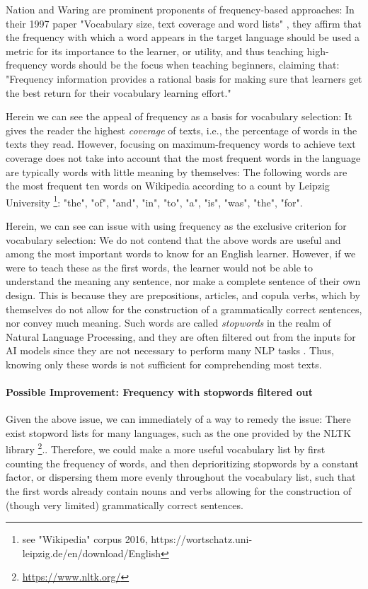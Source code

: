 Nation and Waring are prominent proponents of frequency-based approaches:
In their 1997 paper "Vocabulary size, text coverage and word lists" \cite{nationVocabularySizeText1997}, they affirm that the frequency with which a word appears in the target language should be used a metric for its importance to the learner, or utility, and thus teaching high-frequency words should be the focus when teaching beginners, claiming that:
"Frequency information provides a rational basis for making sure that learners get the best return for their vocabulary learning effort."

Herein we can see the appeal of frequency as a basis for vocabulary selection:
It gives the reader the highest \textit{coverage} of texts, i.e., the percentage of words in the texts they read.
However, focusing on maximum-frequency words to achieve text coverage does not take into account that the most frequent words in the language are typically words with little meaning by themselves: 
The following words are the most frequent ten words on Wikipedia according to a count by Leipzig University \footnote{see "Wikipedia" corpus 2016, https://wortschatz.uni-leipzig.de/en/download/English}:
"the", "of", "and", "in", "to", "a", "is", "was", "the", "for".

Herein, we can see can issue with using frequency as the exclusive criterion for vocabulary selection:
We do not contend that the above words are useful and among the most important words to know for an English learner.
However, if we were to teach these as the first words, the learner would not be able to understand the meaning any sentence, nor make a complete sentence of their own design.
This is because they are prepositions, articles, and copula verbs, which by themselves do not allow for the construction of a grammatically correct sentences, nor convey much meaning.
Such words are called \textit{stopwords} in the realm of Natural Language Processing, and they are often filtered out from the inputs for AI models since they are not necessary to perform many NLP tasks .
Thus, knowing only these words is not sufficient for comprehending most texts.


\paragraph {Possible Improvement: Frequency with stopwords filtered out}
Given the above issue, we can immediately of a way to remedy the issue:
There exist stopword lists for many languages, such as the one provided by the NLTK library \footnote{\url{https://www.nltk.org/}}..
Therefore, we could make a more useful vocabulary list by first counting the frequency of words, and then deprioritizing stopwords by a constant factor, or dispersing them more evenly throughout the vocabulary list, such that the first words already contain nouns and verbs allowing for the construction of (though very limited) grammatically correct sentences.


